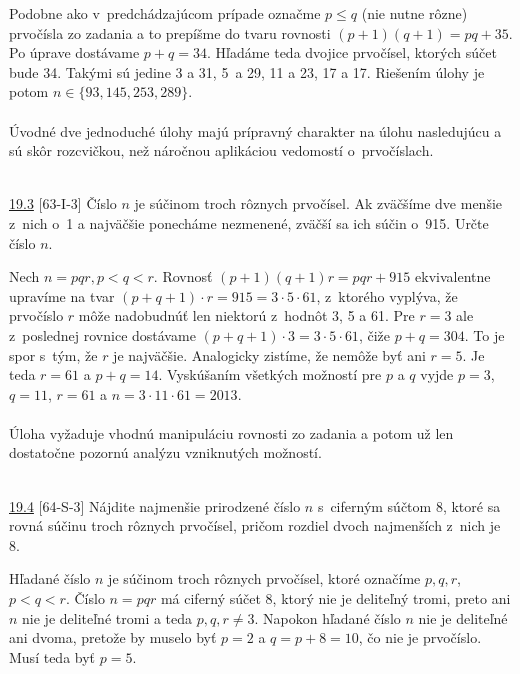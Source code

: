\rie Podobne ako v~predchádzajúcom prípade označme $p\leq q$ (nie nutne rôzne) prvočísla zo zadania a to prepíšme do tvaru rovnosti $(p+1)(q+1)=pq+35$. Po úprave dostávame $p+q=34$. Hľadáme teda dvojice prvočísel, ktorých súčet bude 34. Takými sú jedine 3 a 31, 5~a 29, 11 a 23, 17 a 17. Riešením úlohy je potom $n \in \{93, 145, 253, 289\}$.\\
\\
\kom Úvodné dve jednoduché úlohy majú prípravný charakter na úlohu nasledujúcu a sú skôr rozcvičkou, než náročnou aplikáciou vedomostí o~prvočíslach.\\
\\
\begin{tcolorbox}[breakable,notitle,boxrule=0pt,colback=light-gray,colframe=light-gray]\ul{19.3} [63-I-3]
Číslo $n$ je súčinom troch rôznych prvočísel. Ak zväčšíme dve menšie z~nich o~1 a najväčšie ponecháme nezmenené, zväčší sa ich súčin o~915. Určte číslo $n$.

\end{tcolorbox}

\rieh Nech $n = pqr, p < q < r$. Rovnosť $(p + 1)(q + 1)r = pqr + 915$ ekvivalentne upravíme na tvar $(p + q + 1) \cdot r = 915 = 3 \cdot 5 \cdot 61$, z~ktorého vyplýva, že prvočíslo $r$ môže nadobudnúť len niektorú z~hodnôt 3, 5 a 61. Pre $r = 3$ ale z~poslednej rovnice dostávame $(p + q + 1) \cdot 3 = 3 \cdot 5 \cdot 61$, čiže $p + q = 304$. To je spor s~tým, že $r$ je najväčšie. Analogicky zistíme, že nemôže byť ani $r = 5$. Je teda $r = 61$ a $p + q = 14$. Vyskúšaním všetkých možností pre $p$ a $q$ vyjde $p = 3$, $q = 11$, $r = 61$ a $n = 3 \cdot 11 \cdot 61 = 2 013$.\\
\\
\kom Úloha vyžaduje vhodnú manipuláciu rovnosti zo zadania a potom už len dostatočne pozornú analýzu vzniknutých možností.\\
\\
\begin{tcolorbox}[breakable,notitle,boxrule=0pt,colback=light-gray,colframe=light-gray]\ul{19.4} [64-S-3]
Nájdite najmenšie prirodzené číslo $n$ s~ciferným súčtom 8, ktoré sa rovná súčinu troch rôznych prvočísel, pričom rozdiel dvoch najmenších z~nich je 8.

\end{tcolorbox}

\rieh Hľadané číslo $n$ je súčinom troch rôznych prvočísel, ktoré označíme $p, q, r$, $p < q < r$. Číslo $n = pqr$ má ciferný súčet 8, ktorý nie je deliteľný tromi, preto ani $n$ nie je deliteľné tromi a teda $p, q, r \neq 3$. Napokon hľadané číslo $n$ nie je deliteľné ani dvoma, pretože by muselo byť $p = 2$ a $q = p + 8 = 10$, čo nie je prvočíslo. Musí teda byť $p = 5$.


